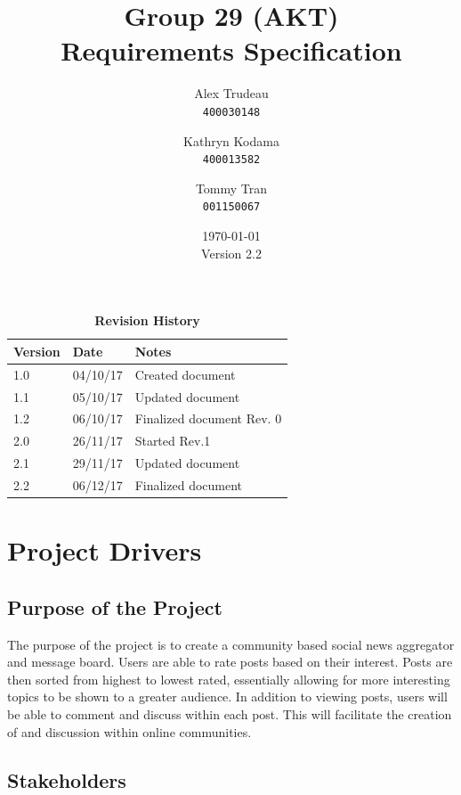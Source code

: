 \documentclass[12pt,fleqn]{article}
\title{Group 29 (AKT)\\ Requirements Specification}
\author{
Alex Trudeau\\
	\texttt{400030148}
\and
Kathryn Kodama\\
  	\texttt{400013582}
\and
Tommy Tran\\
	\texttt{001150067}
}
\date{\today\\Version 2.2}
\begin{document}
\maketitle

\pagebreak
\tableofcontents
\listoftables
\listoffigures

\begin{table}[ht]
\caption{\bf Revision History}
\begin{tabularx}{\textwidth}{p{3cm}p{2cm}X}
\toprule {\bf Version} & {\bf Date} & {\bf Notes}\\
\midrule
1.0 & 04/10/17 & Created document \\
1.1 & 05/10/17 & Updated document \\
1.2 & 06/10/17 & Finalized document Rev. 0 \\
\leavevmode\color{red}2.0 & \leavevmode\color{red}26/11/17 & \leavevmode\color{red}Started Rev.1 \\
\leavevmode\color{red}2.1 & \leavevmode\color{red}29/11/17 & \leavevmode\color{red}Updated document \\
\leavevmode\color{red}2.2 & \leavevmode\color{red}06/12/17 & \leavevmode\color{red}Finalized document \\
\bottomrule
\end{tabularx}
\end{table}

\clearpage
 


\section {Project Drivers}

\subsection {Purpose of the Project}
The purpose of the project is to create a community based social news aggregator and message board. Users are able to rate posts based on their interest. Posts are then sorted from highest to lowest rated, essentially allowing for more interesting topics to be shown to a greater audience. In addition to viewing posts, users will be able to comment and discuss within each post.  This will facilitate the creation of and discussion within online communities.

\subsection {Stakeholders}
\end{document}
